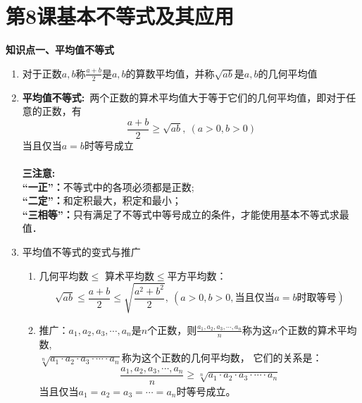\section{第8课\quad 基本不等式及其应用}


\begin{formal}
    {\large \textbf{知识点一、平均值不等式}}
\end{formal}


\begin{enumerate}
    \item 对于正数$a,b$称$\displaystyle \frac{a+b}{2}\text{是}a,b\text{的算数平均值，并称}\sqrt{ab}\text{是}a,b\text{的几何平均值}$

    \item {\large{\textbf{平均值不等式:}}}\ 两个正数的算术平均值大于等于它们的几何平均值，即对于任意的正数，有
    $$
    \frac{a+b}{2}\ge \sqrt{ab},\ (a>0,b>0)
    $$
    当且仅当$a=b$时等号成立\\
    \\
    {\large{\textbf{三注意:}}}\\

    {\large{\textbf{“一正”：}}}不等式中的各项必须都是正数; \\
    {\large{\textbf{“二定”：}}}和定积最大，积定和最小； \\
    {\large{\textbf{“三相等”：}}}只有满足了不等式中等号成立的条件，才能使用基本不等式求最值．\\
    \item 平均值不等式的变式与推广
    \begin{enumerate}
        \item 几何平均数$\le$ 算术平均数$\le$平方平均数：
        $$\displaystyle \sqrt{ab} \le \frac{a+b}{2}  \le  \sqrt{\frac{a^2+b^2}{2}}, \ (a>0,b>0,\text{当且仅当$a=b$时取等号})$$
    
        \item { 推广：$ a_1,a_2,a_3,\cdots,a_n$是$n$个正数，则$\displaystyle \frac{a_1,a_2,a_3,\cdots,a_n}{n}$称为这$n$个正数的算术平均数,\\ 
        $\sqrt[n]{a_1\cdot a_2\cdot a_3\cdot \cdots \cdot a_n}$称为这个正数的几何平均数，
        它们的关系是：
        $$\displaystyle \frac{a_1,a_2,a_3,\cdots,a_n}{n} \ge \sqrt[n]{a_1\cdot a_2\cdot a_3\cdot \cdots \cdot a_n}$$
        当且仅当$  a_1=a_2=a_3=\cdots=a_n$时等号成立。}
    \end{enumerate}
\end{enumerate}


